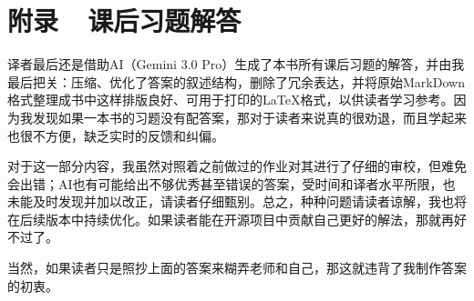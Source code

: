 \chapter*{附录~~课后习题解答}

译者最后还是借助AI（Gemini 3.0 Pro）生成了本书所有课后习题的解答，并由我最后把关：压缩、优化了答案的叙述结构，删除了冗余表达，并将原始MarkDown格式整理成书中这样排版良好、可用于打印的\LaTeX{}格式，以供读者学习参考。因为我发现如果一本书的习题没有配答案，那对于读者来说真的很劝退，而且学起来也很不方便，缺乏实时的反馈和纠偏。

对于这一部分内容，我虽然对照着之前做过的作业对其进行了仔细的审校，但难免会出错；AI也有可能给出不够优秀甚至错误的答案，受时间和译者水平所限，也未能及时发现并加以改正，请读者仔细甄别。总之，种种问题请读者谅解，我也将在后续版本中持续优化。如果读者能在开源项目中贡献自己更好的解法，那就再好不过了。

当然，如果读者只是照抄上面的答案来糊弄老师和自己，那这就违背了我制作答案的初衷。

